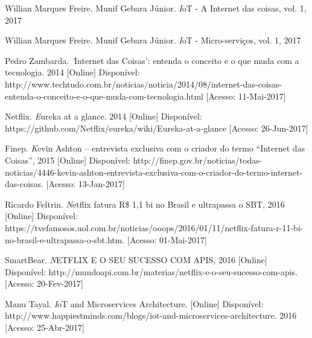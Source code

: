 \documentclass[journal]{IEEEtran}
\begin{document}
%
%
%
\begin{thebibliography}{1}

Willian Marques Freire. Munif Gebara Júnior. \emph IoT - A Internet das coisas, vol. 1, 2017

Willian Marques Freire. Munif Gebara Júnior. \emph IoT - Micro-serviços, vol. 1, 2017

Pedro Zambarda. \emph 'Internet das Coisas': entenda o conceito e o que muda com a tecnologia. 2014 [Online] Disponível: http://www.techtudo.com.br/noticias/noticia/2014/08/internet-das-coisas-entenda-o-conceito-e-o-que-muda-com-tecnologia.html [Acesso: 11-Mai-2017]

Netflix. \emph Eureka at a glance. 2014 [Online] Disponível: 
https://github.com/Netflix/eureka/wiki/Eureka-at-a-glance
[Acesso: 26-Jun-2017]

Finep. \emph Kevin Ashton – entrevista exclusiva com o criador do termo “Internet das Coisas”, 2015 [Online] Disponível: http://finep.gov.br/noticias/todas-noticias/4446-kevin-ashton-entrevista-exclusiva-com-o-criador-do-termo-internet-das-coisas. [Acesso: 13-Jan-2017]

Ricardo Feltrin. \emph Netflix fatura R\$ 1,1 bi no Brasil e ultrapassa o SBT, 2016 [Online] Disponível: https://tvefamosos.uol.com.br/noticias/ooops/2016/01/11/netflix-fatura-r-11-bi-no-brasil-e-ultrapassa-o-sbt.htm. [Acesso: 01-Mai-2017]

SmartBear. \emph NETFLIX E O SEU SUCESSO COM APIS, 2016 [Online] Disponível: http://mundoapi.com.br/materias/netflix-e-o-seu-sucesso-com-apis. [Acesso: 20-Fev-2017] 

Manu Tayal. \emph IoT and Microservices Architecture. [Online] Disponível: http://www.happiestminds.com/blogs/iot-and-microservices-architecture. 2016 [Acesso: 25-Abr-2017]


\end{thebibliography}
\end{document}
